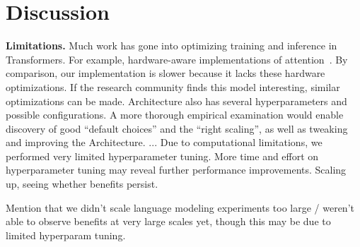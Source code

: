 \section{Discussion}\label{sec:discussion}

\textbf{Limitations.} Much work has gone into optimizing training and inference in Transformers. For example, hardware-aware implementations of attention~\citep{flashattention}. By comparison, our implementation is slower because it lacks these hardware optimizations. If the research community finds this model interesting, similar optimizations can be made. Architecture also has several hyperparameters and possible configurations. A more thorough empirical examination would enable discovery of good ``default choices'' and the ``right scaling'', as well as tweaking and improving the Architecture. ... Due to computational limitations, we performed very limited hyperparameter tuning. More time and effort on hyperparameter tuning may reveal further performance improvements. Scaling up, seeing whether benefits persist.

Mention that we didn't scale language modeling experiments too large / weren't able to observe benefits at very large scales yet, though this may be due to limited hyperparam tuning.

